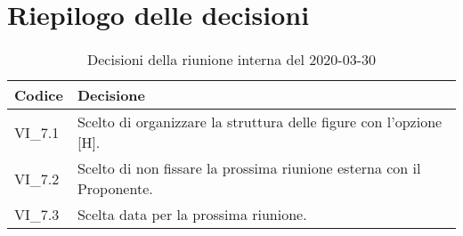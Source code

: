 \section{Riepilogo delle decisioni}
\begin{longtable}{ 
	 >{\centering}p{} >{}p{} }
	
	\caption{Decisioni della riunione interna del 2020-03-30}\\	
	
	\textbf{\color{white}Codice} & 
	\textbf{\color{white}Decisione} 
	\tabularnewline  
	\endhead
	
	VI\_7.1 & Scelto di organizzare la struttura delle figure con l'opzione [H]. \\
	VI\_7.2 & Scelto di non fissare la prossima riunione esterna con il Proponente. \\
	VI\_7.3 & Scelta data per la prossima riunione. \\
	
\end{longtable}
